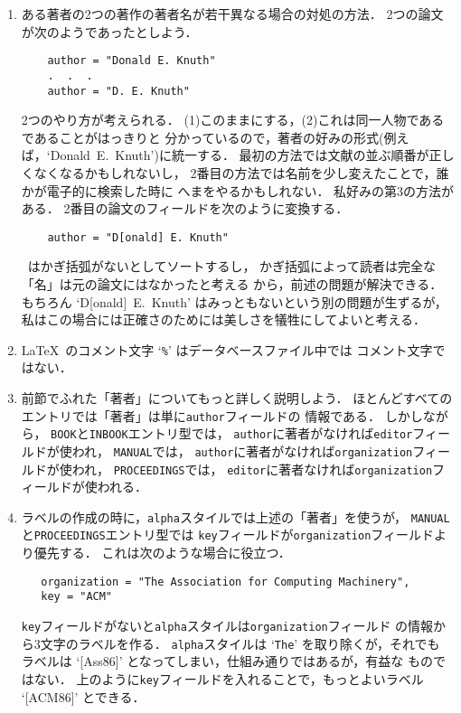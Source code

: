 \begin{enumerate}
\item
ある著者の2つの著作の著者名が若干異なる場合の対処の方法．
2つの論文が次のようであったとしよう．
\begin{verbatim}
    author = "Donald E. Knuth"
    .  .  .
    author = "D. E. Knuth"
\end{verbatim}
2つのやり方が考えられる．
(1)このままにする，(2)これは同一人物であるであることがはっきりと
分かっているので，著者の好みの形式(例えば，`Donald~E.\ Knuth')に統一する．
最初の方法では文献の並ぶ順番が正しくなくなるかもしれないし，
2番目の方法では名前を少し変えたことで，誰かが電子的に検索した時に
へまをやるかもしれない．
私好みの第3の方法がある．
2番目の論文のフィールドを次のように変換する．
\begin{verbatim}
    author = "D[onald] E. Knuth"
\end{verbatim}
\BibTeX\ はかぎ括弧がないとしてソートするし，
かぎ括弧によって読者は完全な「名」は元の論文にはなかったと考える
から，前述の問題が解決できる．
もちろん `D[onald]~E.\ Knuth' はみっともないという別の問題が生ずるが，
私はこの場合には正確さのためには美しさを犠牲にしてよいと考える．

\item
\LaTeX\ のコメント文字 `{\tt\%}' はデータベースファイル中では
コメント文字ではない．

\item
前節でふれた「著者」についてもっと詳しく説明しよう．
ほとんどすべてのエントリでは「著者」は単に{\tt author}フィールドの
情報である．
しかしながら，
{\tt BOOK}と{\tt INBOOK}エントリ型では，
{\tt author}に著者がなければ{\tt editor}フィールドが使われ，
{\tt MANUAL}では，
{\tt author}に著者がなければ{\tt organization}フィールドが使われ，
{\tt PROCEEDINGS}では，
{\tt editor}に著者なければ{\tt organization}フィールドが使われる．

\item
ラベルの作成の時に，{\tt alpha}スタイルでは上述の「著者」を使うが，
{\tt MANUAL}と{\tt PROCEEDINGS}エントリ型では
{\tt key}フィールドが{\tt organization}フィールドより優先する．
これは次のような場合に役立つ．
\begin{verbatim}
   organization = "The Association for Computing Machinery",
   key = "ACM"
\end{verbatim}
{\tt key}フィールドがないと{\tt alpha}スタイルは{\tt organization}フィールド
の情報から3文字のラベルを作る．
{\tt alpha}スタイルは `{\tt The}' を取り除くが，それでも
ラベルは `\hbox{[Ass86]}' となってしまい，仕組み通りではあるが，有益な
ものではない．
上のように{\tt key}フィールドを入れることで，もっとよいラベル
`\hbox{[ACM86]}' とできる．


\end{enumerate}

